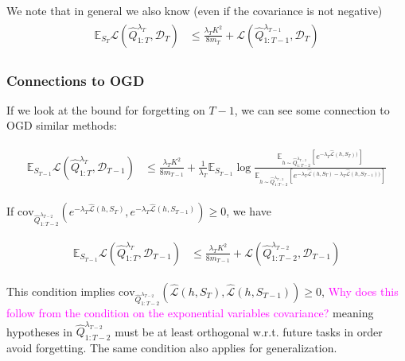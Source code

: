 \documentclass[letterpaper]{article}
\theoremstyle{definition}
\newcommand{\RM}[1]{{\textcolor{magenta}{#1}}}
\begin{document}
We note that in general we also know (even if the covariance is not negative)
\begin{align} 
\begin{split}
\mathbb{E}_{S_T}\mathcal{L}(\hat{Q}^{\lambda_T}_{1:T}, \mathcal{D}_T) &\leq \frac{\lambda_T K^2}{8m_T}+\mathcal{L}(\hat{Q}^{\lambda_{T-1}}_{1:T-1},\mathcal{D}_T)
\end{split}
\end{align}

\iffalse
\subsubsection{Connections to OGD}

If we look at the bound for forgetting on $T-1$, we can see some connection to OGD similar methods:

\begin{align*} 
\begin{split}
\mathbb{E}_{S_{T-1}}\mathcal{L}(\hat{Q}^{\lambda_T}_{1:T}, \mathcal{D}_{T-1}) &\leq \frac{\lambda_T K^2}{8m_{T-1}}+\frac{1}{\lambda_T}\mathbb{E}_{S_{T-1}}\log\frac{\mathbb{E}_{h\sim \hat{Q}^{\lambda_{T-2}}_{1:T-2}}\left [e^{-\lambda_{T}\hat{\mathcal{L}}(h,S_{T}))} \right ]}{\mathbb{E}_{h\sim \hat{Q}^{\lambda_{T-2}}_{1:T-2}}\left [e^{-\lambda_T\hat{\mathcal{L}}(h,S_T)-\lambda_{T}\hat{\mathcal{L}}(h,S_{T-1}))} \right ]}
\end{split}
\end{align*}

If $\mathrm{cov}_{\hat{Q}^{\lambda_{T-2}}_{1:T-2}}(e^{-\lambda_T\hat{\mathcal{L}}(h,S_T)}, e^{-\lambda_{T}\hat{\mathcal{L}}(h,S_{T-1})})\geq 0$, we have

\begin{align} 
\begin{split}
\mathbb{E}_{S_{T-1}}\mathcal{L}(\hat{Q}^{\lambda_T}_{1:T}, \mathcal{D}_{T-1}) &\leq \frac{\lambda_T K^2}{8m_{T-1}}+\mathcal{L}(\hat{Q}^{\lambda_{T-2}}_{1:T-2},\mathcal{D}_{T-1})
\end{split}
\end{align}

This condition implies $\mathrm{cov}_{\hat{Q}^{\lambda_{T-2}}_{1:T-2}}(\hat{\mathcal{L}}(h,S_T), \hat{\mathcal{L}}(h,S_{T-1}))\geq 0$, \RM{Why does this follow from the condition on the exponential variables covariance?} meaning hypotheses in $\hat{Q}^{\lambda_{T-2}}_{1:T-2}$   must be at least orthogonal w.\!r.\!t.\! future tasks in order avoid forgetting. The same condition also applies for generalization.
\end{document}
